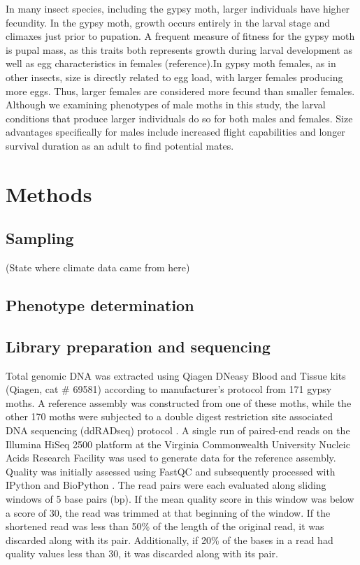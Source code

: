 \documentclass[smallextended]{svjour3}
\begin{document}
In many insect species, including the gypsy moth, larger individuals have
higher
fecundity. In the gypsy moth, growth occurs entirely in the larval stage and
climaxes just prior to pupation. A frequent measure of fitness for the gypsy
moth is pupal mass, as this traits both represents growth during larval
development as well as egg characteristics in females (reference).In gypsy moth
females, as in other insects, size is directly related to egg load, with larger
females producing more eggs. Thus, larger females are considered more fecund
than smaller females. Although we examining phenotypes of male moths in this
study, the larval conditions that produce larger individuals do so for both
males and females. Size advantages specifically for males include increased
flight capabilities and longer survival duration as an adult to find potential
mates.


\section*{Methods}

\subsection*{Sampling}

(State where climate data came from here)

\subsection*{Phenotype determination}

\subsection*{Library preparation and sequencing}

Total genomic DNA was extracted using Qiagen DNeasy Blood and Tissue kits
(Qiagen, cat \# 69581)
according to manufacturer's protocol from 171 gypsy moths. A reference assembly
was constructed
from one of these moths, while the other 170 moths were subjected to a double
digest restriction site
associated DNA sequencing (ddRADseq) protocol \citep{PARCHMAN:2012ca}.
A single run of paired-end reads on the Illumina HiSeq 2500 platform at the
Virginia Commonwealth University Nucleic Acids Research Facility was used to
generate
data for the reference assembly. Quality was initially assessed using 
FastQC \citep{fastqc} and subsequently processed with
IPython \citep{Perez:2007hy} and BioPython \citep{Cock:2009hj}. The read pairs
were each evaluated along sliding windows of 5 base pairs (bp).  If the mean
quality score in this window was below a score of 30, the read was trimmed at
that
beginning of the window. If the shortened read was less than 50\% of the length
of the original read, it was discarded along with its pair. Additionally, if
20\% of the bases in a read had quality values less than 30, it was discarded
along with its pair.
\end{document}

